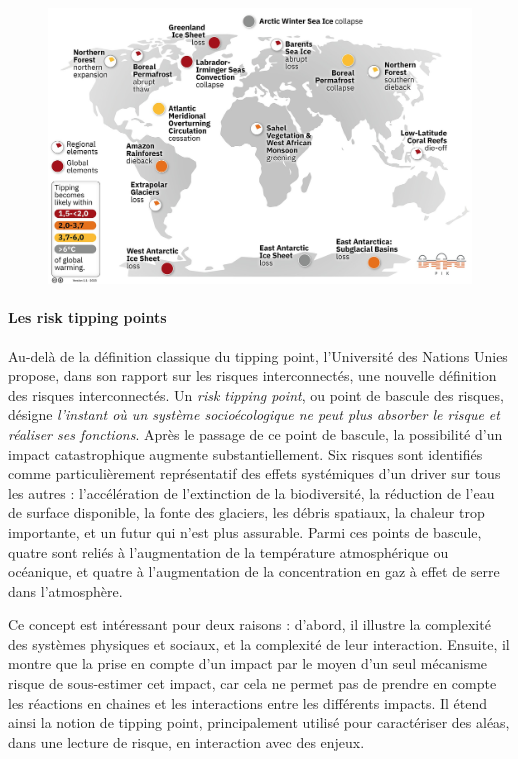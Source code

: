 \begin{figure}
    \centering
    \includegraphics[width=1\linewidth]{figures/Tipping_points_2022_list.jpeg}
    \label{fig:enter-label}
\end{figure}

\paragraph{Les risk tipping points}

Au-delà de la définition classique du tipping point, l'Université des Nations Unies propose, dans son rapport sur les risques interconnectés, une nouvelle définition des risques interconnectés. Un \textit{risk tipping point}, ou point de bascule des risques, désigne \textit{l'instant où un système socioécologique ne peut plus absorber le risque et réaliser ses fonctions}. Après le passage de ce point de bascule, la possibilité d'un impact catastrophique augmente substantiellement. Six risques sont identifiés comme particulièrement représentatif des effets systémiques d'un driver sur tous les autres : l'accélération de l'extinction de la biodiversité, la réduction de l'eau de surface disponible, la fonte des glaciers, les débris spatiaux, la chaleur trop importante, et un futur qui n'est plus assurable. Parmi ces points de bascule, quatre sont  reliés à l'augmentation de la température atmosphérique ou océanique, et quatre à l'augmentation de la concentration en gaz à effet de serre dans l'atmosphère. \cite{united_nations_university_-_institute_for_environment_and_human_security_unu-ehs_interconnected_2023}

Ce concept est intéressant pour deux raisons : d'abord, il illustre la complexité des systèmes physiques et sociaux, et la complexité de leur interaction. Ensuite, il montre que la prise en compte d'un impact par le moyen d'un seul mécanisme risque de sous-estimer cet impact, car cela ne permet pas de prendre en compte les réactions en chaines et les interactions entre les différents impacts. Il étend ainsi la notion de tipping point, principalement utilisé pour caractériser des aléas, dans une lecture de risque, en interaction avec des enjeux. 

